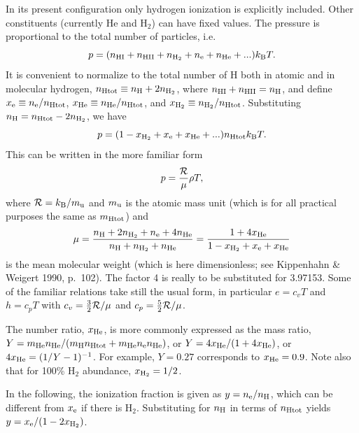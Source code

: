 \documentclass[\mydriver,12pt,twoside,notitlepage,a4paper]{article}
\begin{document}
In its present configuration only hydrogen ionization is explicitly included.
Other constituents (currently He and H$_2$) can have fixed values.
The pressure is proportional to the total number of particles, i.e.\
\begin{equation}
p=(n_{\rm HI}+n_{\rm HII}+n_{\rm H_2}+n_{\rm e}+n_{\rm He}+...)k_{\rm B}T.
\end{equation}
It is convenient to normalize to the total number of H both in atomic
and in molecular hydrogen, $n_{\rm Htot}\equiv n_{\rm H}+2n_{\rm H_2}$,
where $n_{\rm HI}+n_{\rm HII}=n_{\rm H}$, and define
$x_{\rm e}\equiv n_{\rm e}/n_{\rm Htot}$,
$x_{\rm He}\equiv n_{\rm He}/n_{\rm Htot}$, and
$x_{\rm H_2}\equiv n_{\rm H_2}/n_{\rm Htot}$.
Substituting $n_{\rm H}=n_{\rm Htot}-2n_{\rm H_2}$, we have
\begin{equation}
p=(1-x_{\rm H_2}+x_{\rm e}+x_{\rm He}+...)n_{\rm Htot}k_{\rm B}T.
\end{equation}
This can be written in the more familiar form
\begin{equation}
p={{\cal R}\over\mu}\rho T,
\end{equation}
where ${\cal R}=k_{\rm B}/m_{\rm u}$ and
$m_{\rm u}$ is the atomic mass unit (which is for all practical
purposes the same as $m_{\rm Htot}$) and
\begin{equation}
\mu={n_{\rm H}+2n_{\rm H_2}+n_{\rm e}+4n_{\rm He}\over
n_{\rm H}+n_{\rm H_2}+n_{\rm He}}
={1+4x_{\rm He}\over1-x_{\rm H_2}+x_{\rm e}+x_{\rm He}}
\end{equation}
is the mean molecular weight (which is here dimensionless; see
Kippenhahn \& Weigert 1990, p.\ 102).
The factor 4 is really to be substituted for 3.97153.
Some of the familiar relations take still the usual form, in particular
$e=c_vT$ and $h=c_pT$ with $c_v={3\over2}{\cal R}/\mu$ and
$c_p={5\over2}{\cal R}/\mu$.

The number ratio, $x_{\rm He}$, is more commonly expressed as the mass
ratio, $Y=m_{\rm He}n_{\rm He}/(m_{\rm H}n_{\rm Htot}+m_{\rm He}n_{\rm e}n_{\rm He})$,
or $Y=4x_{\rm He}/(1+4x_{\rm He})$, or $4x_{\rm He}=(1/Y-1)^{-1}$.
For example, $Y=0.27$ corresponds to $x_{\rm He}=0.9$.
Note also that for 100\% H$_2$ abundance, $x_{\rm H_2}=1/2$.

In the following, the ionization fraction is given as $y=n_{\rm e}/n_{\rm H}$,
which can be different from $x_{\rm e}$ if there is H$_2$.
Substituting for $n_{\rm H}$ in terms of $n_{\rm Htot}$ yields
$y=x_{\rm e}/(1-2x_{\rm H_2})$.
\end{document}
